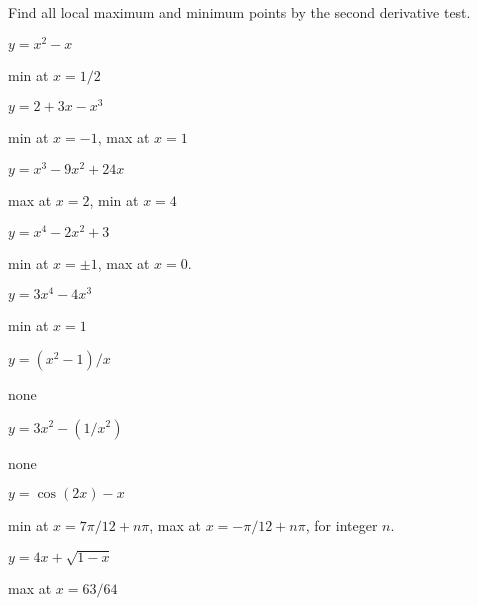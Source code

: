 \begin{exercises}
Find all local maximum and minimum points by the second derivative
test. 

\twocol
\begin{exercise} $y=x^2-x$ 
\begin{answer} min at $x=1/2$
\end{answer}\end{exercise}

\begin{exercise} $y=2+3x-x^3$ 
\begin{answer} min at $x=-1$, max at $x=1$
\end{answer}\end{exercise}

\begin{exercise} $y=x^3-9x^2+24x$
\begin{answer} max at $x=2$, min at $x=4$
\end{answer}\end{exercise}

\begin{exercise} $y=x^4-2x^2+3$ 
\begin{answer} min at $x=\pm 1$, max at $x=0$.
\end{answer}\end{exercise}

\begin{exercise} $y=3x^4-4x^3$
\begin{answer} min at $x=1$
\end{answer}\end{exercise}

\begin{exercise} $y=(x^2-1)/x$
\begin{answer} none
\end{answer}\end{exercise}

\begin{exercise} $y=3x^2-(1/x^2)$ 
\begin{answer} none
\end{answer}\end{exercise}

\begin{exercise} $y=\cos(2x)-x$ 
\begin{answer} min at $x=7\pi/12+n\pi$, max at $x=-\pi/12+n\pi$, for integer $n$.
\end{answer}\end{exercise}

\begin{exercise} $y = 4x+\sqrt{1-x}$
\begin{answer} max at $x=63/64$
\end{answer}\end{exercise}


\end{exercises}
